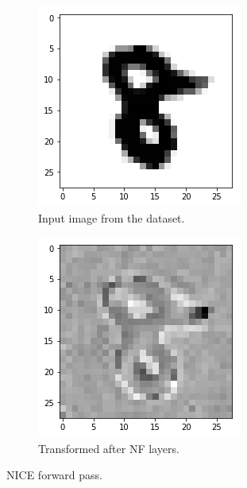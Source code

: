 \begin{figure}[htbp!]
     \centering
     \begin{subfigure}[b]{0.45\textwidth}
         \centering
         \includegraphics[width=\textwidth]{Images/input.png}
         \caption{Input image from the dataset.}
         \label{fig:nice_input}
     \end{subfigure} 
     \hfill
     \begin{subfigure}[b]{0.45\textwidth}
         \centering
         \includegraphics[width=\textwidth]{Images/transformed.png}
         \caption{Transformed after NF layers.}
         \label{fig:nice_transformed}
     \end{subfigure}
        \caption{NICE forward pass.}
        \label{fig:nice_forward}
\end{figure}

